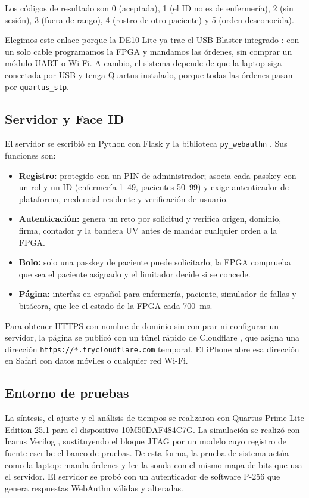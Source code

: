 \documentclass[11pt,letterpaper]{article}
\newcommand{\code}[1]{\texttt{#1}}
\begin{document}
Los códigos de resultado son 0 (aceptada), 1 (el ID no es de enfermería), 2 (sin sesión), 3 (fuera de rango), 4 (rostro de otro paciente) y 5 (orden desconocida).

Elegimos este enlace porque la DE10-Lite ya trae el USB-Blaster integrado \cite{de10lite}: con un solo cable programamos la FPGA y mandamos las órdenes, sin comprar un módulo UART o Wi-Fi. A cambio, el sistema depende de que la laptop siga conectada por USB y tenga Quartus instalado, porque todas las órdenes pasan por \code{quartus\_stp}.

\subsection{Servidor y Face ID}\label{sec:servidor}
El servidor se escribió en Python con Flask \cite{flask} y la biblioteca \code{py\_webauthn} \cite{pywebauthn}. Sus funciones son:
\begin{itemize}
\item \textbf{Registro:} protegido con un PIN de administrador; asocia cada passkey con un rol y un ID (enfermería 1--49, pacientes 50--99) y exige autenticador de plataforma, credencial residente y verificación de usuario.
\item \textbf{Autenticación:} genera un reto por solicitud y verifica origen, dominio, firma, contador y la bandera UV antes de mandar cualquier orden a la FPGA.
\item \textbf{Bolo:} solo una passkey de paciente puede solicitarlo; la FPGA comprueba que sea el paciente asignado y el limitador decide si se concede.
\item \textbf{Página:} interfaz en español para enfermería, paciente, simulador de fallas y bitácora, que lee el estado de la FPGA cada 700~ms.
\end{itemize}

Para obtener HTTPS con nombre de dominio sin comprar ni configurar un servidor, la página se publicó con un túnel rápido de Cloudflare \cite{cloudflare}, que asigna una dirección \code{https://*.trycloudflare.com} temporal. El iPhone abre esa dirección en Safari con datos móviles o cualquier red Wi-Fi.

\subsection{Entorno de pruebas}
La síntesis, el ajuste y el análisis de tiempos se realizaron con Quartus Prime Lite Edition 25.1 para el dispositivo 10M50DAF484C7G. La simulación se realizó con Icarus Verilog \cite{iverilog}, sustituyendo el bloque JTAG por un modelo cuyo registro de fuente escribe el banco de pruebas. De esta forma, la prueba de sistema actúa como la laptop: manda órdenes y lee la sonda con el mismo mapa de bits que usa el servidor. El servidor se probó con un autenticador de software P-256 que genera respuestas WebAuthn válidas y alteradas.
\end{document}
